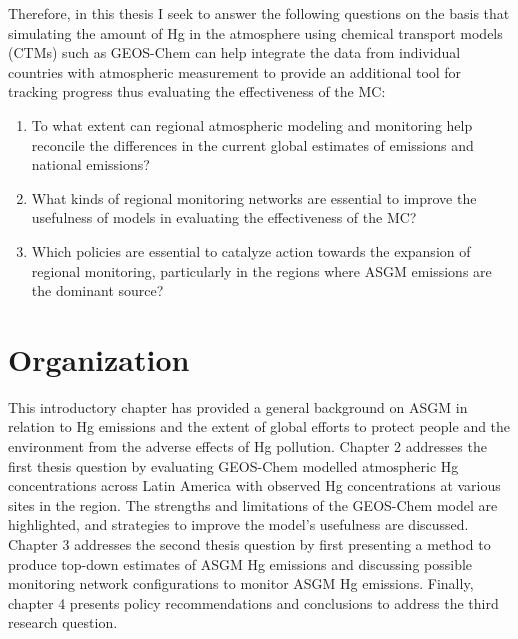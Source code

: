 \begin{flushleft}
 Therefore, in this thesis I seek to answer the following questions on the basis that simulating the amount of Hg in the atmosphere using chemical transport models (CTMs) such as GEOS-Chem can help integrate the data from individual countries with atmospheric measurement to provide an additional tool for tracking progress thus evaluating the effectiveness of the MC:
\begin{enumerate}
  \item To what extent can regional atmospheric modeling and monitoring help reconcile the differences in the current global estimates of emissions and national emissions?
  \item What kinds of regional monitoring networks are essential to improve the usefulness of models in evaluating the effectiveness of the MC?
  \item Which policies are essential to catalyze action towards the expansion of regional monitoring, particularly in the regions where ASGM emissions are the dominant source?
\end{enumerate}
\end{flushleft}



 
\section{Organization}

This introductory chapter has provided a general background on ASGM in relation to Hg emissions and the extent of global efforts to protect people and the environment from the adverse effects of Hg pollution. Chapter 2 addresses the first thesis question by evaluating GEOS-Chem modelled atmospheric Hg concentrations across Latin America with observed Hg concentrations at various sites in the region. The strengths and limitations of the GEOS-Chem model are highlighted, and strategies to improve the model's usefulness are discussed. Chapter 3 addresses the second thesis question by first presenting a method to produce top-down estimates of ASGM Hg emissions and discussing possible monitoring network configurations to monitor ASGM Hg emissions. Finally, chapter 4 presents policy recommendations and conclusions to address the third research question.



